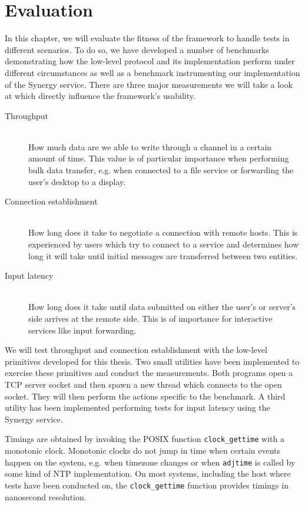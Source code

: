 \chapter{Evaluation}
\label{sec:evaluation}

In this chapter, we will evaluate the fitness of the framework to handle tests in different scenarios.
To do so, we have developed a number of benchmarks demonstrating how the low-level protocol and its implementation perform under different circumstances as well as a benchmark instrumenting our implementation of the Synergy service.
There are three major measurements we will take a look at which directly influence the framework's usability.
\begin{description}
    \item[Throughput]\hfill\\
        How much data are we able to write through a channel in a certain amount of time.
        This value is of particular importance when performing bulk data transfer, e.g. when connected to a file service or forwarding the user's desktop to a display.
    \item[Connection establishment]\hfill\\
        How long does it take to negotiate a connection with remote hosts.
        This is experienced by users which try to connect to a service and determines how long it will take until initial messages are transferred between two entities.
    \item[Input latency]\hfill\\
        How long does it take until data submitted on either the user's or server's side arrives at the remote side.
        This is of importance for interactive services like input forwarding.
\end{description}

We will test throughput and connection establishment with the low-level primitives developed for this thesis.
Two small utilities have been implemented to exercise these primitives and conduct the measurements.
Both programs open a TCP server socket and then spawn a new thread which connects to the open socket.
They will then perform the actions specific to the benchmark.
A third utility has been implemented performing tests for input latency using the Synergy service.

Timings are obtained by invoking the POSIX function \lstinline{clock_gettime} with a monotonic clock.
Monotonic clocks do not jump in time when certain events happen on the system, e.g. when timezone changes or when \lstinline{adjtime} is called by some kind of NTP implementation.
On most systems, including the host where tests have been conducted on, the \lstinline{clock_gettime} function provides timings in nanosecond resolution.

